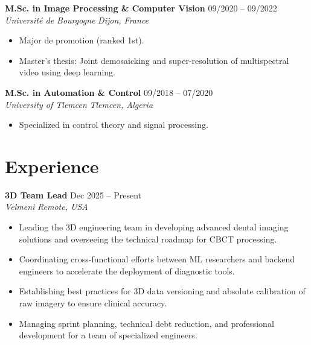 \documentclass[a4paper,11pt]{article}
\newcommand{\experienceheader}[4]{
    \noindent \textbf{#1} \hfill #2 \\
    \textit{#3} \hfill \textit{#4} \vspace{2pt}
}
\begin{document}
\experienceheader{M.Sc. in Image Processing \& Computer Vision}{09/2020 -- 09/2022}{Université de Bourgogne}{Dijon, France}
\begin{itemize}
    \item Major de promotion (ranked 1st).
    \item Master's thesis: Joint demosaicking and super-resolution of multispectral video using deep learning.
\end{itemize}
\vspace{8pt}

\experienceheader{M.Sc. in Automation \& Control}{09/2018 -- 07/2020}{University of Tlemcen}{Tlemcen, Algeria}
\begin{itemize}
    \item Specialized in control theory and signal processing.
\end{itemize}


\section{Experience}

\experienceheader{3D Team Lead}{Dec 2025 -- Present}{Velmeni}{Remote, USA}
\begin{itemize}
    \item Leading the 3D engineering team in developing advanced dental imaging solutions and overseeing the technical roadmap for CBCT processing.
    \item Coordinating cross-functional efforts between ML researchers and backend engineers to accelerate the deployment of diagnostic tools.
    \item Establishing best practices for 3D data versioning and absolute calibration of raw imagery to ensure clinical accuracy.
    \item Managing sprint planning, technical debt reduction, and professional development for a team of specialized engineers.
\end{itemize}
\vspace{4pt}
\end{document}

